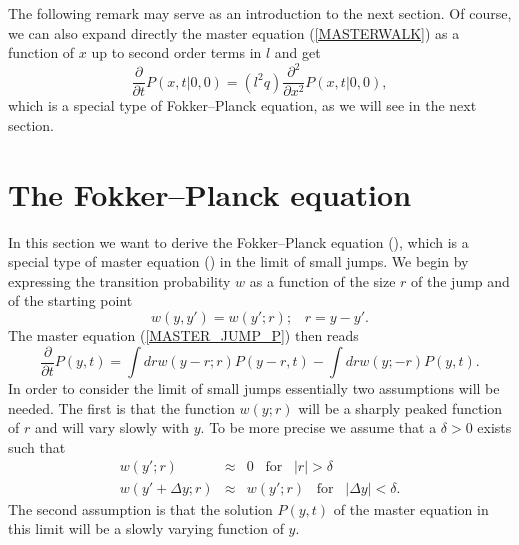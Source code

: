 The following remark may serve as an introduction to the next 
section. Of course, we can also expand directly the master equation
(\ref{MASTERWALK}) as a function of $x$ up to second order terms 
in $l$ and get
\begin{equation*}
\frac{\partial}{\partial t} P(x,t|0,0) =
     (l^2q) \frac{\partial^2}{\partial x^2} P(x,t|0,0),
\end{equation*}
which is a special type of Fokker--Planck equation, as we will see 
in the next section.

\section{The Fokker--Planck equation}
In this section we want to derive the Fokker--Planck equation
(\cite{RISKEN}),
which is a special type of master equation (\cite{VAN_KAMPEN})
in the limit of small jumps.
We begin by expressing the transition probability $w$ as a 
function of the size $r$ of the jump and of the starting point
\begin{equation*}
w(y,y') = w(y';r); \;\;\; r=y-y'.
\end{equation*}
The master equation (\ref{MASTER_JUMP_P}) then reads
\begin{equation}
\label{MASTER_SMALL_JUMP}
\frac{\partial}{\partial t} P(y,t) =
  \int dr w(y-r;r)P(y-r,t) - \int dr w(y;-r)P(y,t).
\end{equation}
In order to consider the limit of small jumps essentially
two assumptions will be needed. The first is that
the function
$w(y;r)$ will be a sharply peaked function of $r$ and will
vary slowly with $y$. To be more precise we assume that a $\delta >0$
exists such that
\begin{eqnarray*}
w(y';r)  & \approx & 0 \;\;\; \text{for} \;\;\; |r|> \delta \\
w(y'+\Delta y;r) & \approx & w(y';r) \;\;\; \text{for} \;\;\; |\Delta y| < 
\delta.
\end{eqnarray*}
The second assumption is that the solution $P(y,t)$ of the master equation 
in this limit will be a slowly varying function of $y$.

